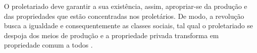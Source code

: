 O proletariado deve garantir a sua existência, assim, apropriar-se da produção e das propriedades que estão concentradas nos proletários. 
De modo, a revolução busca a igualdade e consequentemente as classes sociais, tal qual o proletariado se despoja dos meios de produção e a propriedade privada transforma em propriedade comum a todos \cite{marx_ideologia}.

